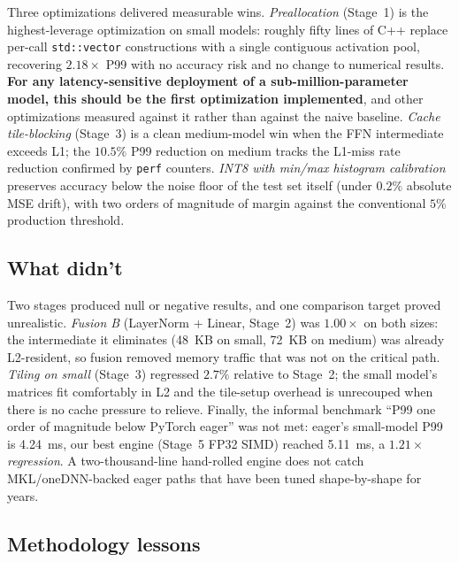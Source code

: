 \documentclass{article}
\begin{document}
Three optimizations delivered measurable wins.
\emph{Preallocation} (Stage~1) is the highest-leverage optimization on small models: roughly fifty lines of C++ replace per-call \texttt{std::vector} constructions with a single contiguous activation pool, recovering $2.18\times$ P99 with no accuracy risk and no change to numerical results.
\textbf{For any latency-sensitive deployment of a sub-million-parameter model, this should be the first optimization implemented}, and other optimizations measured against it rather than against the naive baseline.
\emph{Cache tile-blocking} (Stage~3) is a clean medium-model win when the FFN intermediate exceeds L1; the $10.5\%$ P99 reduction on medium tracks the L1-miss rate reduction confirmed by \texttt{perf} counters.
\emph{INT8 with min/max histogram calibration} preserves accuracy below the noise floor of the test set itself (under $0.2\%$ absolute MSE drift), with two orders of magnitude of margin against the conventional $5\%$ production threshold.

\subsection{What didn't}

Two stages produced null or negative results, and one comparison target proved unrealistic.
\emph{Fusion B} (LayerNorm + Linear, Stage~2) was $1.00\times$ on both sizes: the intermediate it eliminates (48~KB on small, 72~KB on medium) was already L2-resident, so fusion removed memory traffic that was not on the critical path.
\emph{Tiling on small} (Stage~3) regressed $2.7\%$ relative to Stage~2; the small model's matrices fit comfortably in L2 and the tile-setup overhead is unrecouped when there is no cache pressure to relieve.
Finally, the informal benchmark ``P99 one order of magnitude below PyTorch eager'' was not met: eager's small-model P99 is 4.24~ms, our best engine (Stage~5 FP32 SIMD) reached 5.11~ms, a $1.21\times$ \emph{regression}.
A two-thousand-line hand-rolled engine does not catch MKL/oneDNN-backed eager paths that have been tuned shape-by-shape for years.

\subsection{Methodology lessons}
\end{document}

